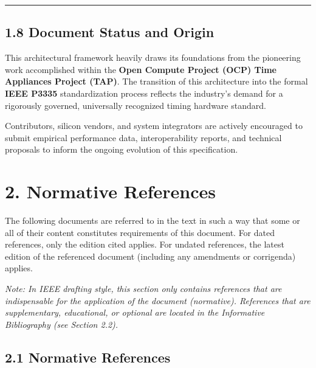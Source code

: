 \documentclass[
]{article}
\begin{document}
\begin{center}\rule{0.5\linewidth}{0.5pt}\end{center}

\subsection{1.8 Document Status and
Origin}\label{document-status-and-origin}

This architectural framework heavily draws its foundations from the
pioneering work accomplished within the \textbf{Open Compute Project
(OCP) Time Appliances Project (TAP)}. The transition of this
architecture into the formal \textbf{IEEE P3335} standardization process
reflects the industry's demand for a rigorously governed, universally
recognized timing hardware standard.

Contributors, silicon vendors, and system integrators are actively
encouraged to submit empirical performance data, interoperability
reports, and technical proposals to inform the ongoing evolution of this
specification.

\section{2. Normative References}\label{normative-references}

The following documents are referred to in the text in such a way that
some or all of their content constitutes requirements of this document.
For dated references, only the edition cited applies. For undated
references, the latest edition of the referenced document (including any
amendments or corrigenda) applies.

\emph{Note: In IEEE drafting style, this section only contains
references that are indispensable for the application of the document
(normative). References that are supplementary, educational, or optional
are located in the Informative Bibliography (see Section 2.2).}

\subsection{2.1 Normative References}\label{normative-references-1}
\end{document}
